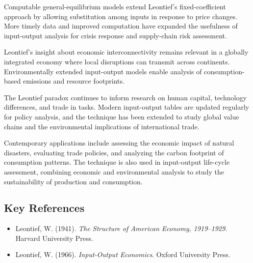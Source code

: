Computable general-equilibrium models extend Leontief's fixed-coefficient approach by allowing
substitution among inputs in response to price changes. More timely data and improved computation
have expanded the usefulness of input-output analysis for crisis response and supply-chain risk
assessment.

Leontief's insight about economic interconnectivity remains relevant in a globally integrated
economy where local disruptions can transmit across continents. Environmentally extended
input-output models enable analysis of consumption-based emissions and resource footprints.

The Leontief paradox continues to inform research on human capital, technology differences, and
trade in tasks. Modern input-output tables are updated regularly for policy analysis, and the
technique has been extended to study global value chains and the environmental implications of
international trade.

Contemporary applications include assessing the economic impact of natural disasters, evaluating
trade policies, and analyzing the carbon footprint of consumption patterns. The technique is also
used in input-output life-cycle assessment, combining economic and environmental analysis to study
the sustainability of production and consumption.

\subsection*{Key References}
\begin{itemize}
    \item Leontief, W. (1941). \textit{The Structure of American Economy, 1919--1929}.
    Harvard University Press.
    \item Leontief, W. (1966). \textit{Input-Output Economics}. Oxford University Press.
\end{itemize}
